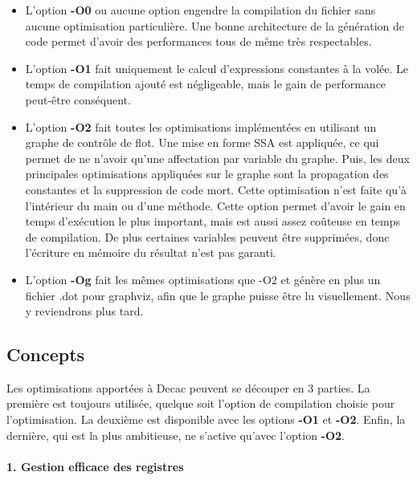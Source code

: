 \documentclass[
]{article}
\begin{document}
\begin{itemize}
\item
  L'option \textbf{-O0} ou aucune option engendre la compilation du
  fichier sans aucune optimisation particulière. Une bonne architecture
  de la génération de code permet d'avoir des performances tous de même
  très respectables.
\item
  L'option \textbf{-O1} fait uniquement le calcul d'expressions
  constantes à la volée. Le temps de compilation ajouté est négligeable,
  mais le gain de performance peut-être conséquent.
\item
  L'option \textbf{-O2} fait toutes les optimisations implémentées en
  utilisant un graphe de contrôle de flot. Une mise en forme SSA est
  appliquée, ce qui permet de ne n'avoir qu'une affectation par variable
  du graphe. Puis, les deux principales optimisations appliquées sur le
  graphe sont la propagation des constantes et la suppression de code
  mort. Cette optimisation n'est faite qu'à l'intérieur du main ou d'une
  méthode. Cette option permet d'avoir le gain en temps d'exécution le
  plus important, mais est aussi assez coûteuse en temps de compilation.
  De plus certaines variables peuvent être supprimées, donc l'écriture
  en mémoire du résultat n'est pas garanti.
\item
  L'option \textbf{-Og} fait les mêmes optimisations que -O2 et génère
  en plus un fichier .dot pour graphviz, afin que le graphe puisse être
  lu visuellement. Nous y reviendrons plus tard.
\end{itemize}

\hypertarget{concepts}{%
\subsection{Concepts}\label{concepts}}

Les optimisations apportées à Decac peuvent se découper en 3 parties. La
première est toujours utilisée, quelque soit l'option de compilation
choisie pour l'optimisation. La deuxième est disponible avec les options
\textbf{-O1} et \textbf{-O2}. Enfin, la dernière, qui est la plus
ambitieuse, ne s'active qu'avec l'option \textbf{-O2}.

\hypertarget{1-gestion-efficace-des-registres}{%
\paragraph{1. Gestion efficace des
registres}\label{1-gestion-efficace-des-registres}}
\end{document}
